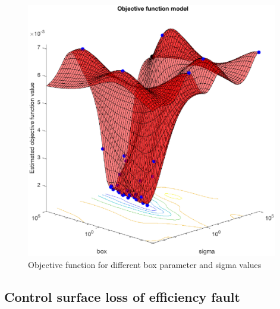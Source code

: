 \begin{figure}
\begin{center}
\includegraphics[width=11cm]{figures/objFunc2}    %
\caption{Objective function for different box parameter and sigma values} 
\label{fig:objFunc1}
\end{center}
\end{figure}

\fi

\subsection{Control surface loss of efficiency fault}


